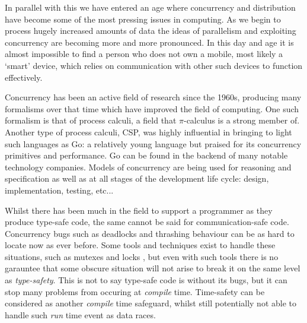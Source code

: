 \documentclass[11pt, abstracton, twoside, titlepage=true]{scrartcl}
\begin{document}
In parallel with this we have entered an age where concurrency and 
distribution have become some of the most pressing issues in computing. As we 
begin to process hugely increased amounts of data the ideas of parallelism and 
exploiting concurrency are becoming more and more pronounced. In this day and age
it is almost impossible to find a person who does not own a mobile, most likely a 
`smart' device, which relies on communication with other such devices to function 
effectively. 

Concurrency has been an active field of research since the 1960s, producing
many formalisms over that time which have improved the field of computing. One 
such formalism is that of process calculi, a field that $\pi$-calculus is a strong
member of. Another type of process calculi, CSP, was highly influential in 
bringing to light such languages as Go: a relatively young language but praised
for its concurrency primitives and performance. Go can be found in the backend
of many notable technology companies. Models of concurrency are being used for
reasoning and specification as well as at all stages of the development life
cycle: design, implementation, testing, etc...

Whilst there has been much in the field to support a programmer as they produce
type-safe code, the same cannot be said for communication-safe code. Concurrency
bugs such as deadlocks and thrashing behaviour can be as hard to locate now as
ever before. Some tools and techniques exist to handle these situations, such as
mutexes and locks \cite{T95}, but even with such tools there is no garauntee
that some obscure situation will not arise to break it on the same level as 
\emph{type-safety}. This is not to say type-safe code is without its bugs, but it 
can stop many problems from occuring at \emph{compile} time. Time-safety can be 
considered as another \emph{compile} time safeguard, whilst still potentially not 
able to handle such \emph{run} time event as data races.

\end{document}
